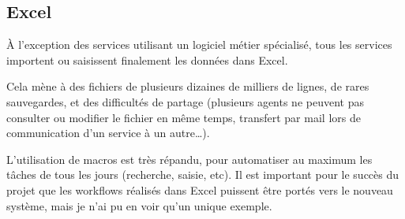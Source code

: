 \subsection{Excel}\label{subsec:excel}

À l'exception des services utilisant un logiciel métier spécialisé, tous les services importent ou saisissent finalement les données dans Excel.

Cela mène à des fichiers de plusieurs dizaines de milliers de lignes, de rares sauvegardes, et des difficultés de partage (plusieurs agents ne peuvent pas consulter ou modifier le fichier en même temps, transfert par mail lors de communication d'un service à un autre…).

L'utilisation de macros est très répandu, pour automatiser au maximum les tâches de tous les jours (recherche, saisie, etc).
Il est important pour le succès du projet que les workflows réalisés dans Excel puissent être portés vers le nouveau système, mais je n'ai pu en voir qu'un unique exemple.
